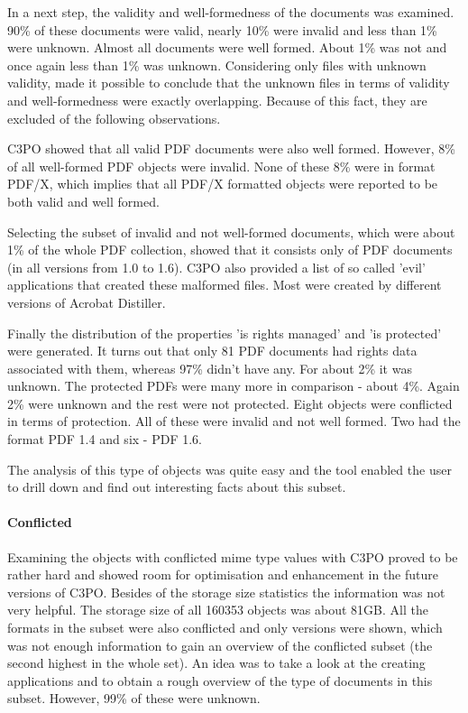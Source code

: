 In a next step, the validity and well-formedness of the documents was examined.
90\% of these documents were valid, nearly 10\% were invalid and less than 1\% were unknown.
Almost all documents were well formed. About 1\% was not and once again less than 1\% was unknown.
Considering only files with unknown validity, made it possible to conclude that  the unknown files in terms of validity and well-formedness were exactly overlapping.
Because of this fact, they are excluded of the following observations.

C3PO showed that all valid PDF documents were also well formed.
However, 8\% of all well-formed PDF objects were invalid.
None of these 8\% were in format PDF/X, which implies that all PDF/X formatted objects were reported to be both valid and well formed.

Selecting the subset of invalid and not well-formed documents, which were about 1\% of the whole PDF collection, showed that it consists only of PDF documents (in all versions from 1.0 to 1.6).
C3PO also provided a list of so called 'evil' applications that created these malformed files.
Most were created by different versions of Acrobat Distiller.

Finally the distribution of the properties 'is rights managed' and 'is protected' were generated.
It turns out that only 81 PDF documents had rights data associated with them, whereas 97\% didn't have any.
For about 2\% it was unknown.
The protected PDFs were many more in comparison - about 4\%.
Again 2\% were unknown and the rest were not protected.
Eight objects were conflicted in terms of protection.
All of these were invalid and not well formed. Two had the format PDF 1.4 and six - PDF 1.6.

The analysis of this type of objects was quite easy and the tool enabled the user to drill down and find out interesting facts about this subset.

\paragraph{Conflicted}
Examining the objects with conflicted mime type values with C3PO proved to be rather hard and showed room for optimisation and enhancement in the future versions of C3PO.
Besides of the storage size statistics the information was not very helpful.
The storage size of all 160353 objects was about 81GB.
All the formats in the subset were also conflicted and only versions were shown, which was not enough information to gain an overview of the conflicted subset (the second highest in the whole set).
An idea was to take a look at the creating applications and to obtain a rough overview of the type of documents in this subset.
However, 99\% of these were unknown.

